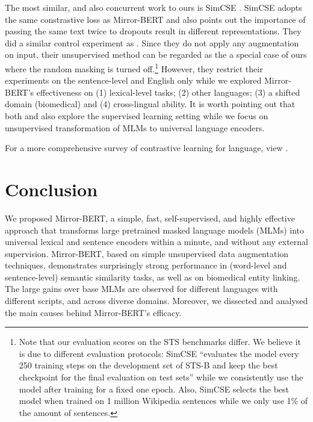 \documentclass[11pt]{article}
\begin{document}
The most similar, and also concurrent work to ours is SimCSE \citep{gao2021simcse}. SimCSE adopts the same constrastive loss as Mirror-BERT and also points out the importance of passing the same text twice to dropouts result in different representations. They did a similar control experiment as . Since they do not apply any augmentation on input, their unsupervised method can be regarded as the a special case of ours where the random masking is turned off.\footnote{Note that our evaluation scores on the STS benchmarks differ. We believe it is due to different evaluation protocols: SimCSE ``evaluates the
model every 250 training steps on the development
set of STS-B and keep the best checkpoint for the
final evaluation on test sets'' while we consistently use the model after training for a fixed one epoch. Also, SimCSE selects the best model when trained on 1 million Wikipedia sentences while we only use 1\% of the amount of sentences.} However, they restrict their experiments on the sentence-level and English only while we explored Mirror-BERT's effectiveness on (1) lexical-level tasks; (2) other languages; (3) a shifted domain (biomedical) and (4) cross-lingual ability. It is worth pointing out that both \citep{carlsson2021semantic} and \citep{gao2021simcse} also explore the supervised learning setting while we focus on unsupervised transformation of MLMs to universal language encoders.

For a more comprehensive survey of contrastive learning for language, view \citep{rethmeier2021primer}.

\fi



\section{Conclusion} \label{sec:conclusion}
We proposed Mirror-BERT, a simple, fast, self-supervised, and highly effective approach that transforms large pretrained masked language models (MLMs) into universal lexical and sentence encoders within a minute, and without any external supervision. Mirror-BERT, based on simple unsupervised data augmentation techniques, demonstrates surprisingly strong performance in (word-level and sentence-level) semantic similarity tasks, as well as on biomedical entity linking. The large gains over base MLMs are observed for different languages with different scripts, and across diverse domains. Moreover, we dissected and analysed the main causes behind Mirror-BERT's efficacy.
\end{document}
